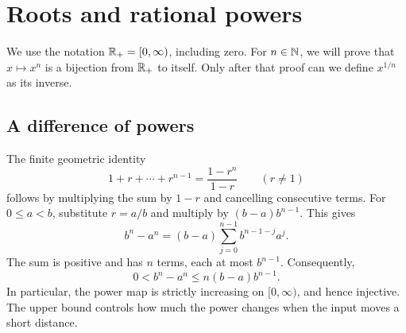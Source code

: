 \clearpage
\section{Roots and rational powers}
\label{sec:analysis-i:roots-and-powers}

 We use the notation
$\mathbb{R}_+=[0,\infty)$, including zero. For $n\in\mathbb{N}$, we will prove
that $x\mapsto x^n$ is a bijection from $\mathbb{R}_+$ to itself. Only after that
proof can we define $x^{1/n}$ as its inverse.

\subsection{A difference of powers}
The finite geometric identity
\[
  1+r+\cdots+r^{n-1}=\frac{1-r^n}{1-r}\qquad(r\ne1)
\]
follows by multiplying the sum by $1-r$ and cancelling consecutive terms.
For $0\leq a<b$, substitute $r=a/b$ and multiply by $(b-a)b^{n-1}$.
This gives
\begin{equation}
  b^n-a^n=(b-a)\sum_{j=0}^{n-1}b^{n-1-j}a^j.
  \label{eq:analysis-i:power-difference}
\end{equation}
The sum is positive and has $n$ terms, each at most $b^{n-1}$. Consequently,
\begin{equation}
  0<b^n-a^n\leq n(b-a)b^{n-1}.
  \label{eq:analysis-i:power-bound}
\end{equation}
In particular, the power map is strictly increasing on $[0,\infty)$,
and hence injective. The upper bound controls how much the power changes
when the input moves a short distance.

